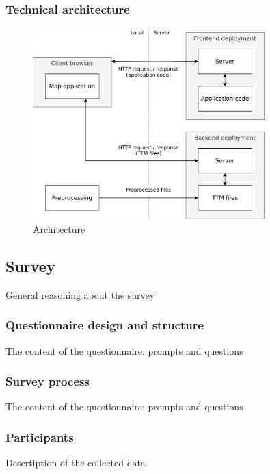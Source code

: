 \subsubsection{Technical architecture}

\begin{figure}[H]
	\centering
	\includegraphics[width=0.8\textwidth]{visual/figures/diagrams/architechture.png}
	\caption{Architecture}
	\label{fig:architechture}
\end{figure}






\subsection{Survey}
General reasoning about the survey

\subsubsection{Questionnaire design and structure}
The content of the questionnaire: prompts and questions

\subsubsection{Survey process}
The content of the questionnaire: prompts and questions

\subsubsection{Participants}
Descrtiption of the collected data
